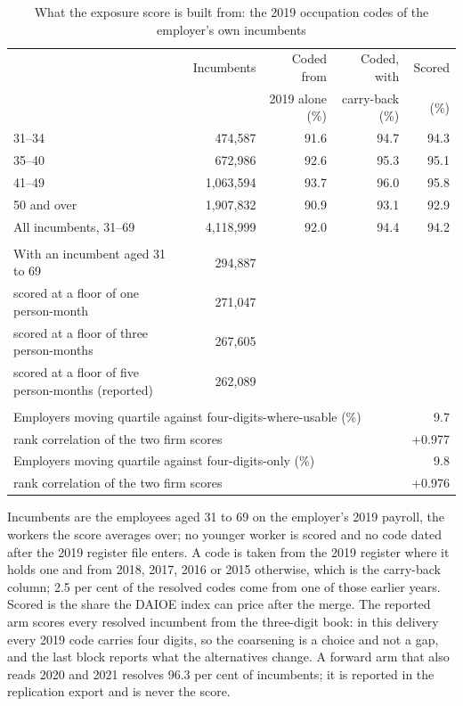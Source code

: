 \begin{table}[ht!]
\centering
\caption{What the exposure score is built from: the 2019 occupation codes of the employer's own incumbents}
\label{tab:occ_coverage}
\scriptsize
\setlength{\tabcolsep}{5pt}
\begin{tabular}{lrrrr}
\toprule
 & Incumbents & Coded from & Coded, with & Scored \\
 & & 2019 alone (\%) & carry-back (\%) & (\%) \\
\midrule
31--34 & 474,587 & 91.6 & 94.7 & 94.3 \\
35--40 & 672,986 & 92.6 & 95.3 & 95.1 \\
41--49 & 1,063,594 & 93.7 & 96.0 & 95.8 \\
50 and over & 1,907,832 & 90.9 & 93.1 & 92.9 \\
\midrule
All incumbents, 31--69 & 4,118,999 & 92.0 & 94.4 & 94.2 \\
\addlinespace[3pt]
\midrule
\multicolumn{5}{l}{\textit{Employers, and the floor}} \\
With an incumbent aged 31 to 69 & 294,887 & & & \\
\quad scored at a floor of one person-month & 271,047 & & & \\
\quad scored at a floor of three person-months & 267,605 & & & \\
\quad scored at a floor of five person-months (reported) & 262,089 & & & \\
\addlinespace[3pt]
\midrule
\multicolumn{5}{l}{\textit{What the scoring level changes}} \\
\multicolumn{4}{l}{Employers moving quartile against four-digits-where-usable (\%)} & 9.7 \\
\multicolumn{4}{l}{\quad rank correlation of the two firm scores} & +0.977 \\
\multicolumn{4}{l}{Employers moving quartile against four-digits-only (\%)} & 9.8 \\
\multicolumn{4}{l}{\quad rank correlation of the two firm scores} & +0.976 \\
\bottomrule
\end{tabular}
\begin{minipage}{0.92\textwidth}\footnotesize\vspace{4pt}
Incumbents are the employees aged 31 to 69 on the employer's 2019 payroll, the workers the score averages over; no younger worker is scored and no code dated after the 2019 register file enters. A code is taken from the 2019 register where it holds one and from 2018, 2017, 2016 or 2015 otherwise, which is the carry-back column; 2.5 per cent of the resolved codes come from one of those earlier years. Scored is the share the DAIOE index can price after the merge. The reported arm scores every resolved incumbent from the three-digit book: in this delivery every 2019 code carries four digits, so the coarsening is a choice and not a gap, and the last block reports what the alternatives change. A forward arm that also reads 2020 and 2021 resolves 96.3 per cent of incumbents; it is reported in the replication export and is never the score.
\end{minipage}
\end{table}

